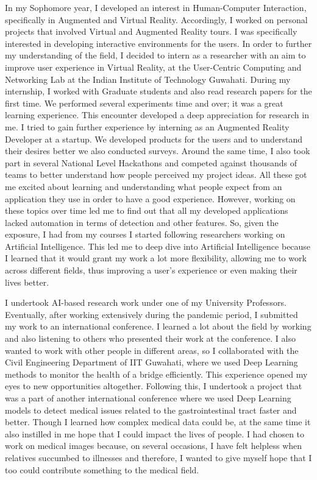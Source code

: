\documentclass[11pt]{article}
\begin{document}
In my Sophomore year, I developed an interest in Human-Computer Interaction, specifically in Augmented and Virtual Reality. Accordingly, I worked on personal projects that involved Virtual and Augmented Reality tours. I was specifically interested in developing interactive environments for the users. In order to further my understanding of the field, I decided to intern as a researcher with an aim to improve user experience in Virtual Reality, at the User-Centric Computing and Networking Lab at the Indian Institute of Technology Guwahati. During my internship, I worked with Graduate students and also read research papers for the first time. We performed several experiments time and over; it was a great learning experience. This encounter developed a deep appreciation for research in me. I tried to gain further experience by interning as an Augmented Reality Developer at a startup. We developed products for the users and to understand their desires better we also conducted surveys. Around the same time, I also took part in several National Level Hackathons and competed against thousands of teams to better understand how people perceived my project ideas. All these got me excited about learning and understanding what people expect from an application they use in order to have a good experience. However, working on these topics over time led me to find out that all my developed applications lacked automation in terms of detection and other features. So, given the exposure, I had from my courses I started following researchers working on Artificial Intelligence. This led me to deep dive into Artificial Intelligence because I learned that it would grant my work a lot more flexibility, allowing me to work across different fields, thus improving a user’s experience or even making their lives better. \par
I undertook AI-based research work under one of my University Professors. Eventually, after working extensively during the pandemic period, I submitted my work to an international conference. I learned a lot about the field by working and also listening to others who presented their work at the conference. I also wanted to work with other people in different areas, so I collaborated with the Civil Engineering Department of IIT Guwahati, where we used Deep Learning methods to monitor the health of a bridge efficiently. This experience opened my eyes to new opportunities altogether. Following this, I undertook a project that was a part of another international conference where we used Deep Learning models to detect medical issues related to the gastrointestinal tract faster and better. Though I learned how complex medical data could be, at the same time it also instilled in me hope that I could impact the lives of people. I had chosen to work on medical images because, on several occasions, I have felt helpless when relatives succumbed to illnesses and therefore, I wanted to give myself hope that I too could contribute something to the medical field. \par
\end{document}
